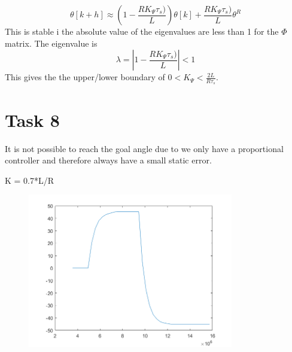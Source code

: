 \documentclass[a4paper,12pt,oneside,onecolumn]{article} %
\begin{document}
\begin{equation*}
\theta[k+h]\approx  (1-\frac{R K_\Psi \tau_s)}{L})\theta[k]+\frac{R K_\Psi \tau_s)}{L}\theta^R
\end{equation*}
This is stable i the absolute value of the eigenvalues are less than 1 for the $\Phi$ matrix. The eigenvalue is
\begin{equation*}
\lambda = |1-\frac{R K_\Psi \tau_s)}{L}|<1
\end{equation*}
This gives the the upper/lower boundary of $0<K_\Psi<\frac{2L}{R\tau_s}$. 

\section*{Task 8}

It is not possible to reach the goal angle due to we only have a proportional controller and therefore always have a small static error.

K = 0.7*L/R
\begin{figure}[H]
\begin{center}	
  \includegraphics[width = 0.8\textwidth]{task8.png}
 \end{center}
\end{figure}
\end{document}
